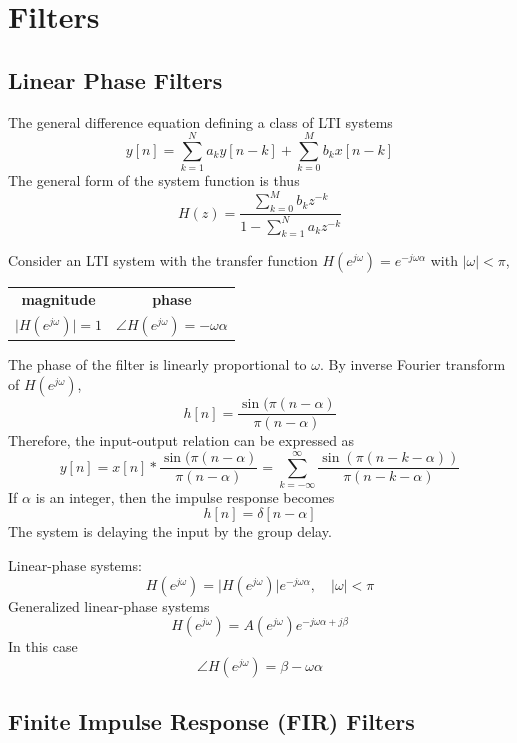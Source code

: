 \section{Filters}
\subsection{Linear Phase Filters}
The general difference equation defining a class of LTI systems
\[
    y[n] = \sum_{k=1}^{N} a_{k}y[n-k] + \sum_{k=0}^{M} b_{k}x[n-k]
\]
The general form of the system function is thus
\begin{equation}
    \label{eqn:LTI_sys_func}
    H(z) = \frac{\sum_{k=0}^{M} b_{k} z^{-k}}{1-\sum_{k=1}^{N} a_{k} z^{-k}}
\end{equation}

Consider an LTI system with the transfer function $H(e^{j\omega}) = e^{-j\omega \alpha}$ with $\lvert \omega \rvert < \pi$, 
\begin{table}[H]
    \centering
    \begin{tabular}{c|c}
    \textbf{magnitude} & \textbf{phase} \\[1em]
    $\lvert H(e^{j\omega}) \rvert = 1$ &  $\angle  H(e^{j\omega}) = -\omega \alpha$
\end{tabular}
\end{table}
The phase of the filter is linearly proportional to $\omega$.
By inverse Fourier transform of $H(e^{j\omega})$, 
\[
    h[n] = \frac{\sin(\pi(n-\alpha)}{\pi(n-\alpha)}
\]
Therefore, the input-output relation can be expressed as
\[
    y[n] = x[n] * \frac{\sin(\pi(n-\alpha)}{\pi(n-\alpha)}
    = \sum_{k=-\infty}^{\infty} \frac{\sin(\pi(n-k-\alpha))}{\pi(n-k-\alpha)}
\]
If $\alpha$ is an integer, then the impulse response becomes
\[
    h[n] = \delta[n-\alpha]
\]
The system is delaying the input by the group delay.

Linear-phase systems:
\[
    H(e^{j\omega}) = \lvert H(e^{j\omega}) \rvert e^{-j\omega \alpha}, \quad \lvert \omega \rvert < \pi
\]
Generalized linear-phase systems
\[
     H(e^{j\omega}) =  A(e^{j\omega})  e^{-j\omega \alpha + j \beta}
\]
In this case
\[
    \angle  H(e^{j\omega}) = \beta -\omega \alpha
\]

\subsection{Finite Impulse Response (FIR) Filters}
